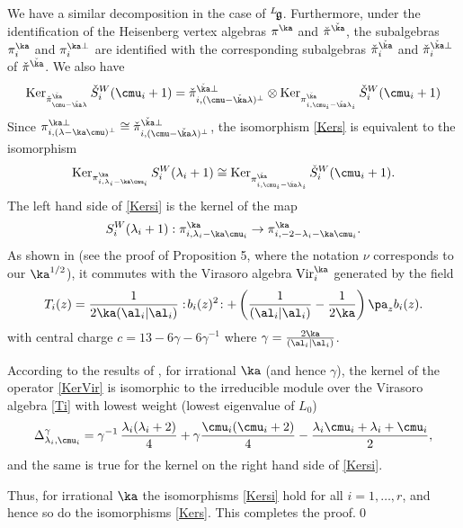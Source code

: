 \documentclass{amsart}
\newcommand{\on}{\operatorname}
\newcommand{\+}{\mathop{\oplus}}
\renewcommand{\*}{{\otimes}}
\newcommand{\mf}{\mathfrak}
\newcommand{\g}{\mf{g}}
\newcommand{\lam}{\lambda}
\def\neg{\negthinspace}
\def\lg{{}^L\neg\g}
\theoremstyle{theorem}
\theoremstyle{remark}
\numberwithin{equation}{section}
\begin{document}
We have a similar decomposition in the case of $\lg$. Furthermore,
under the identification of the Heisenberg vertex algebras $\pi^\ka$
and $\check\pi^{\check\ka}$, the subalgebras $\pi^\ka_i$ and
$\pi^{\ka\perp}_i$ are identified with the corresponding subalgebras
$\check\pi^{\check\ka}_i$ and $\check\pi^{\check\ka \perp}_i$ of
$\check\pi^{\check\ka}$. We also have
$$
\on{Ker}_{\check\pi^{\check\ka}_{\cmu-\check\ka\lam}}
\check{S}^W_i(\cmu_i+1) =
\check\pi^{\check\ka\perp}_{i,(\cmu-\check\ka\lam)^\perp}
\otimes \on{Ker}_{\pi^{\check\ka}_{i,\cmu_i-\check\ka\lam_i}}
\check{S}^W_i(\cmu_i+1)
$$
Since $\pi^{\ka\perp}_{i,(\lam-\ka\cmu)^\perp} \cong
\check\pi^{\check\ka\perp}_{i,(\cmu-\check\ka\lam)^\perp}$,
the isomorphism \eqref{Kers}
is equivalent to the isomorphism
\begin{equation}    \label{Kersi}
\on{Ker}_{\pi^\ka_{i,\lam_i-\ka\cmu_i}}
S^W_i(\lam_i+1) \cong \on{Ker}_{\pi^{\check\ka}_{i,\cmu_i-\check\ka\lam_i}}
\check{S}^W_i(\cmu_i+1).
\end{equation}
The left hand side of \eqref{Kersi} is the kernel of the map
\begin{equation}    \label{KerVir}
S^W_i(\lam_i+1): \pi^\ka_{i,\lam_i-\ka\cmu_i} \to
\pi^\ka_{i,-2-\lam_i-\ka\cmu_i}.
\end{equation}
As shown in \cite{FF} (see the proof of Proposition 5, where the
notation $\nu$ corresponds to our $\ka^{1/2}$), it commutes with the
Virasoro algebra $\on{Vir}_i^\ka$ generated by the field
\begin{equation}    \label{Ti}
T_i(z) = \frac{1}{2\ka(\al_i|\al_i)} :\! b_i(z)^2 \! : +
\left( \frac{1}{(\al_i|\al_i)} - \frac{1}{2\ka} \right) \pa_z b_i(z).
\end{equation}
with central charge $c=13-6\gamma-6\gamma^{-1}$ where $\gamma =
\frac{2\ka}{(\al_i|\al_i)}$.

According to the results of \cite{Kac,FeFu,TsuKan86}, for irrational
$\ka$ (and hence $\gamma$), the kernel of the operator \eqref{KerVir}
is isomorphic to the irreducible module over the Virasoro algebra
\eqref{Ti} with lowest weight (lowest eigenvalue of $L_0$)
\begin{equation}    \label{Deltagamma}
\Delta^\gamma_{\lam_i,\cmu_i} = \gamma^{-1}\, \frac{\lam_i(\lam_i+2)}{4} +
\gamma \frac{\cmu_i(\cmu_i+2)}{4} - \frac{\lam_i\cmu_i+\lam_i+\cmu_i}{2},
\end{equation}
and the same is true for the kernel on the right hand side of
\eqref{Kersi}.

Thus, for irrational $\ka$ the isomorphisms \eqref{Kersi} hold for all
$i=1,\dots,r$, and hence so do the isomorphisms \eqref{Kers}. This
completes the proof.\qed
\end{document}
